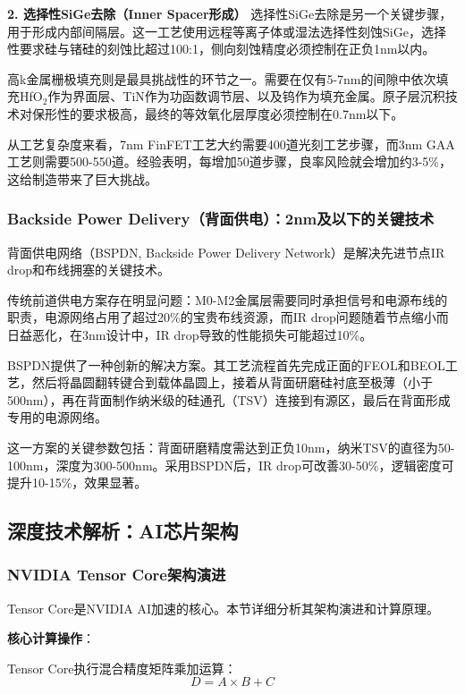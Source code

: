 \textbf{2. 选择性SiGe去除（Inner Spacer形成）}
选择性SiGe去除是另一个关键步骤，用于形成内部间隔层。这一工艺使用远程等离子体或湿法选择性刻蚀SiGe，选择性要求硅与锗硅的刻蚀比超过100:1，侧向刻蚀精度必须控制在正负1nm以内。

高k金属栅极填充则是最具挑战性的环节之一。需要在仅有5-7nm的间隙中依次填充HfO$_2$作为界面层、TiN作为功函数调节层、以及钨作为填充金属。原子层沉积技术对保形性的要求极高，最终的等效氧化层厚度必须控制在0.7nm以下。

从工艺复杂度来看，7nm FinFET工艺大约需要400道光刻工艺步骤，而3nm GAA工艺则需要500-550道。经验表明，每增加50道步骤，良率风险就会增加约3-5\%，这给制造带来了巨大挑战。

\subsubsection{Backside Power Delivery（背面供电）：2nm及以下的关键技术}

背面供电网络（BSPDN, Backside Power Delivery Network）是解决先进节点IR drop和布线拥塞的关键技术\cite{Intel2024BSPDN, IEDM2024BSPDN}。

传统前道供电方案存在明显问题：M0-M2金属层需要同时承担信号和电源布线的职责，电源网络占用了超过20\%的宝贵布线资源，而IR drop问题随着节点缩小而日益恶化，在3nm设计中，IR drop导致的性能损失可能超过10\%。

BSPDN提供了一种创新的解决方案。其工艺流程首先完成正面的FEOL和BEOL工艺，然后将晶圆翻转键合到载体晶圆上，接着从背面研磨硅衬底至极薄（小于500nm），再在背面制作纳米级的硅通孔（TSV）连接到有源区，最后在背面形成专用的电源网络。

这一方案的关键参数包括：背面研磨精度需达到正负10nm，纳米TSV的直径为50-100nm，深度为300-500nm。采用BSPDN后，IR drop可改善30-50\%，逻辑密度可提升10-15\%，效果显著。

\subsection{深度技术解析：AI芯片架构}

\subsubsection{NVIDIA Tensor Core架构演进}

Tensor Core是NVIDIA AI加速的核心。本节详细分析其架构演进和计算原理\cite{NVIDIABlackwell2024, HotChips2024NVIDIA}。

\textbf{核心计算操作}：

Tensor Core执行混合精度矩阵乘加运算：
\begin{equation}
D = A \times B + C
\end{equation}

